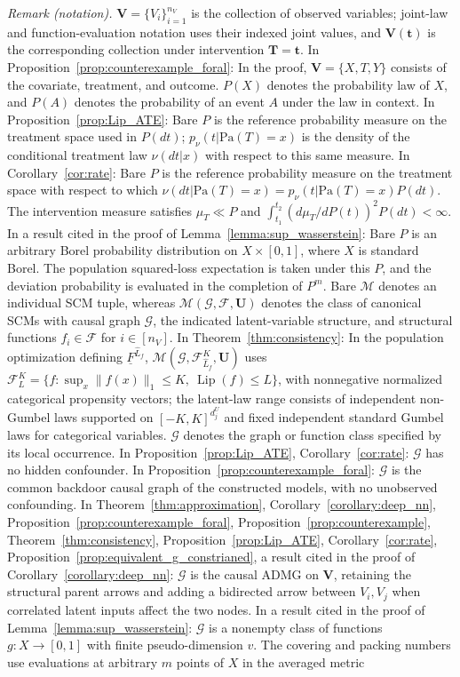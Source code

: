 \documentclass[12pt]{article}
\theoremstyle{plain}
\theoremstyle{definition}
\theoremstyle{remark}
\begin{document}
\noindent\textit{Remark (notation).} $\boldsymbol{V}=\{V_i\}_{i=1}^{n_V}$ is the collection of observed variables; joint-law and function-evaluation notation uses their indexed joint values, and $\boldsymbol{V}(\boldsymbol{t})$ is the corresponding collection under intervention $\boldsymbol{T}=\boldsymbol{t}$. In Proposition~\ref{prop:counterexample_foral}: In the proof, $\boldsymbol{V}=\{X,T,Y\}$ consists of the covariate, treatment, and outcome. $P(X)$ denotes the probability law of $X$, and $P(A)$ denotes the probability of an event $A$ under the law in context. In Proposition~\ref{prop:Lip_ATE}: Bare $P$ is the reference probability measure on the treatment space used in $P(dt)$; $p_\nu(t|\text{Pa}(T)=x)$ is the density of the conditional treatment law $\nu(dt|x)$ with respect to this same measure. In Corollary~\ref{cor:rate}: Bare $P$ is the reference probability measure on the treatment space with respect to which $\nu(dt|\text{Pa}(T)=x)=p_\nu(t|\text{Pa}(T)=x)P(dt)$. The intervention measure satisfies $\mu_T\ll P$ and $\int_{t_1}^{t_2}(d\mu_T/dP(t))^2P(dt)<\infty$. In a result cited in the proof of Lemma~\ref{lemma:sup_wasserstein}: Bare $P$ is an arbitrary Borel probability distribution on $X\times[0,1]$, where $X$ is standard Borel. The population squared-loss expectation is taken under this $P$, and the deviation probability is evaluated in the completion of $P^m$. Bare $\mathcal{M}$ denotes an individual SCM tuple, whereas $\mathcal{M}(\mathcal{G},\mathcal{F},\boldsymbol{U})$ denotes the class of canonical SCMs with causal graph $\mathcal{G}$, the indicated latent-variable structure, and structural functions $f_i\in\mathcal{F}$ for $i\in[n_V]$. In Theorem~\ref{thm:consistency}: In the population optimization defining $\underline F^{\hat L_f}$, $\mathcal M(\mathcal G,\mathcal F_{\hat L_f}^K,\boldsymbol U)$ uses $\mathcal F_L^K=\{f:\sup_x\|f(x)\|_1\leqslant K,\ \operatorname{Lip}(f)\leqslant L\}$, with nonnegative normalized categorical propensity vectors; the latent-law range consists of independent non-Gumbel laws supported on $[-K,K]^{d_j^U}$ and fixed independent standard Gumbel laws for categorical variables. $\mathcal G$ denotes the graph or function class specified by its local occurrence. In Proposition~\ref{prop:Lip_ATE}, Corollary~\ref{cor:rate}: $\mathcal{G}$ has no hidden confounder. In Proposition~\ref{prop:counterexample_foral}: $\mathcal{G}$ is the common backdoor causal graph of the constructed models, with no unobserved confounding. In Theorem~\ref{thm:approximation}, Corollary~\ref{corollary:deep_nn}, Proposition~\ref{prop:counterexample_foral}, Proposition~\ref{prop:counterexample}, Theorem~\ref{thm:consistency}, Proposition~\ref{prop:Lip_ATE}, Corollary~\ref{cor:rate}, Proposition~\ref{prop:equivalent_g_constrianed}, a result cited in the proof of Corollary~\ref{corollary:deep_nn}: $\mathcal G$ is the causal ADMG on $\boldsymbol V$, retaining the structural parent arrows and adding a bidirected arrow between $V_i,V_j$ when correlated latent inputs affect the two nodes. In a result cited in the proof of Lemma~\ref{lemma:sup_wasserstein}: $\mathcal G$ is a nonempty class of functions $g:X\rightarrow[0,1]$ with finite pseudo-dimension $v$. The covering and packing numbers use evaluations at arbitrary $m$ points of $X$ in the averaged metric 
\end{document}
